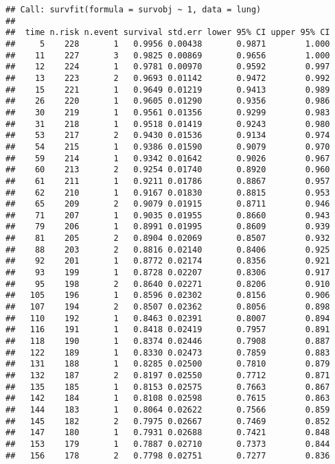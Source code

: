 \documentclass[]{article}
\begin{document}
\begin{verbatim}
## Call: survfit(formula = survobj ~ 1, data = lung)
## 
##  time n.risk n.event survival std.err lower 95% CI upper 95% CI
##     5    228       1   0.9956 0.00438       0.9871        1.000
##    11    227       3   0.9825 0.00869       0.9656        1.000
##    12    224       1   0.9781 0.00970       0.9592        0.997
##    13    223       2   0.9693 0.01142       0.9472        0.992
##    15    221       1   0.9649 0.01219       0.9413        0.989
##    26    220       1   0.9605 0.01290       0.9356        0.986
##    30    219       1   0.9561 0.01356       0.9299        0.983
##    31    218       1   0.9518 0.01419       0.9243        0.980
##    53    217       2   0.9430 0.01536       0.9134        0.974
##    54    215       1   0.9386 0.01590       0.9079        0.970
##    59    214       1   0.9342 0.01642       0.9026        0.967
##    60    213       2   0.9254 0.01740       0.8920        0.960
##    61    211       1   0.9211 0.01786       0.8867        0.957
##    62    210       1   0.9167 0.01830       0.8815        0.953
##    65    209       2   0.9079 0.01915       0.8711        0.946
##    71    207       1   0.9035 0.01955       0.8660        0.943
##    79    206       1   0.8991 0.01995       0.8609        0.939
##    81    205       2   0.8904 0.02069       0.8507        0.932
##    88    203       2   0.8816 0.02140       0.8406        0.925
##    92    201       1   0.8772 0.02174       0.8356        0.921
##    93    199       1   0.8728 0.02207       0.8306        0.917
##    95    198       2   0.8640 0.02271       0.8206        0.910
##   105    196       1   0.8596 0.02302       0.8156        0.906
##   107    194       2   0.8507 0.02362       0.8056        0.898
##   110    192       1   0.8463 0.02391       0.8007        0.894
##   116    191       1   0.8418 0.02419       0.7957        0.891
##   118    190       1   0.8374 0.02446       0.7908        0.887
##   122    189       1   0.8330 0.02473       0.7859        0.883
##   131    188       1   0.8285 0.02500       0.7810        0.879
##   132    187       2   0.8197 0.02550       0.7712        0.871
##   135    185       1   0.8153 0.02575       0.7663        0.867
##   142    184       1   0.8108 0.02598       0.7615        0.863
##   144    183       1   0.8064 0.02622       0.7566        0.859
##   145    182       2   0.7975 0.02667       0.7469        0.852
##   147    180       1   0.7931 0.02688       0.7421        0.848
##   153    179       1   0.7887 0.02710       0.7373        0.844
##   156    178       2   0.7798 0.02751       0.7277        0.836

\end{verbatim}
\end{document}
